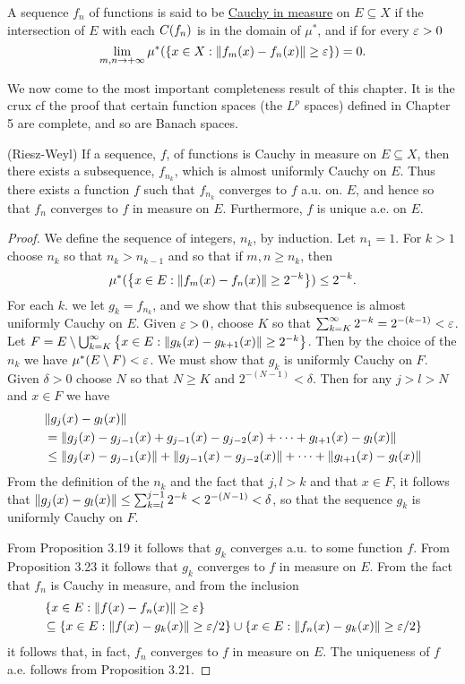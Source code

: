\begin{definition}
A sequence $f_n$ of functions is said to be \underline{Cauchy in measure} on $E \subseteq X$ if the intersection of $E$ with each $C(f_n)$ is in the domain of $\mu^*$, and if for every $\varepsilon>0$ $$\lim_{m,n\to+\infty}\mu^*(\left\{x\in X:\norm{f_m(x)-f_n(x)}\geq\varepsilon\right\})=0.$$
\end{definition}

We now come to the most important completeness result of this chapter. It is the crux cf the proof that certain function spaces (the $L^p$ spaces) defined in Chapter 5 are complete, and so are Banach spaces.

\begin{theorem}(Riesz-Weyl)
If a sequence, $f$, of functions is Cauchy in measure on $E \subseteq X$, then there exists a subsequence, $f_{n_k}$, which is almost uniformly Cauchy on $E$. Thus there exists a function $f$ such that $f_{n_k}$ converges to $f$ a.u. on. $E$, and hence so that $f_n$ converges to $f$ in measure on $E$. Furthermore, $f$ is unique a.e. on $E$.
\end{theorem}

\begin{proof}
We define the sequence of integers, $n_k$, by induction. Let $n_1=1$. For $k>1$ choose $n_k$ so that $n_k>n_{k-1}$ and so that if $m,n \geq n_k$, then $$\mu^*(\left\{x\in E:\norm{f_m(x)-f_n(x)}\geq2^{-k}\right\})\leq 2^{-k}.$$ For each $k$. we let $g_k=f_{n_k}$, and we show that this subsequence is almost uniformly Cauchy on $E$. Given $\varepsilon>0$, choose $K$ so that $\sum_{k=K}^\infty 2^{-k}=2^{-(k-1)}<\varepsilon$. Let $F=E\setminus\bigcup_{k=K}^\infty\left\{x \in E:\norm{g_k(x)-g_{k+1}(x)}\geq2^{-k}\right\}$. Then by the choice of the $n_k$ we have $\mu^*(E\setminus F)<\varepsilon$. We must show that $g_k$ is uniformly Cauchy on $F$. Given $\delta>0$ choose $N$ so that $N \geq K$ and $2^{-(N-1)}<\delta$. Then for any $j>l>N$ and $x \in F$ we have
\begin{align*}
&\norm{g_j(x)-g_l(x)} \\
&=\norm{g_j(x)-g_{j-1}(x)+g_{j-1}(x)-g_{j-2}(x)+\dots+g_{l+1}(x)-g_l(x)} \\
&\leq\norm{g_j(x)-g_{j-1}(x)}+\norm{g_{j-1}(x)-g_{j-2}(x)}+\dots+\norm{g_{l+1}(x)-g_l(x)}
\end{align*}
From the definition of the $n_k$ and the fact that $j, l>k$ and that $x \in F$, it follows that $\norm{g_j(x)-g_l(x)} \leq \sum_{k=l}^{j-1} 2^{-k}<2^{-(N-1)}<\delta$, so that the sequence $g_k$ is uniformly Cauchy on $F$.

From Proposition 3.19 it follows that $g_k$ converges a.u. to some function $f$. From Proposition 3.23 it follows that $g_k$ converges to $f$ in measure on $E$. From the fact that $f_n$ is Cauchy in measure, and from the inclusion
\begin{align*}
&\left\{x \in E:\norm{f(x)-f_n(x)} \geq \varepsilon\right\}\\
&\subseteq\left\{x\in E:\norm{f(x)-g_k(x)}\geq\varepsilon/2\right\}\cup\left\{x\in E:\norm{f_n(x)-g_k(x)}\geq\varepsilon/2\right\}
\end{align*}
it follows that, in fact, $f_n$ converges to $f$ in measure on $E$. The uniqueness of $f$ a.e. follows from Proposition 3.21.
\end{proof}

